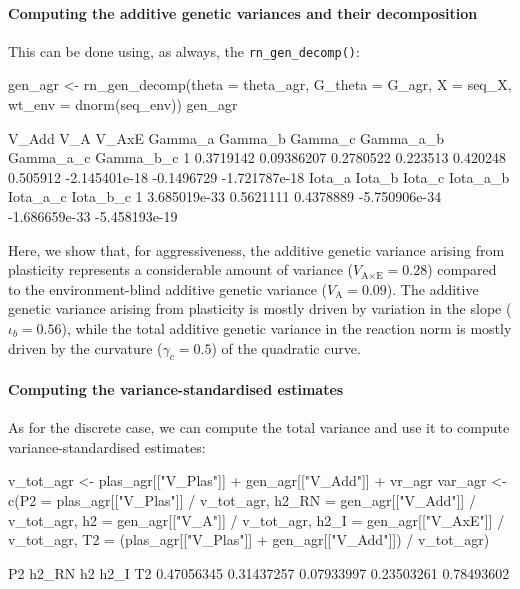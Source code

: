 \documentclass[a4paper,12pt,twoside]{article}
\begin{document}
\paragraph{Computing the additive genetic variances and their decomposition}
This can be done using, as always, the \texttt{rn\_gen\_decomp()}:
\begin{Rinput}
gen_agr <-
    rn_gen_decomp(theta     = theta_agr,
                  G_theta   = G_agr,
                  X         = seq_X,
                  wt_env    = dnorm(seq_env))
gen_agr
\end{Rinput}
\begin{Routput}
      V_Add        V_A     V_AxE  Gamma_a  Gamma_b  Gamma_c     Gamma_a_b  Gamma_a_c     Gamma_b_c
1 0.3719142 0.09386207 0.2780522 0.223513 0.420248 0.505912 -2.145401e-18 -0.1496729 -1.721787e-18
        Iota_a    Iota_b    Iota_c      Iota_a_b      Iota_a_c      Iota_b_c
1 3.685019e-33 0.5621111 0.4378889 -5.750906e-34 -1.686659e-33 -5.458193e-19
\end{Routput}
Here, we show that, for aggressiveness, the additive genetic variance arising from plasticity represents a considerable amount of variance ($V_{\text{A}\times\text{E}}=0.28$) compared to the environment-blind additive genetic variance ($V_{\text{A}}=0.09$).
The additive genetic variance arising from plasticity is mostly driven by variation in the slope ($\iota_{b} = 0.56$), while the total additive genetic variance in the reaction norm is mostly driven by the curvature ($\gamma_{c}=0.5$) of the quadratic curve.

\paragraph{Computing the variance-standardised estimates}
As for the discrete case, we can compute the total variance and use it to compute variance-standardised estimates:
\begin{Rinput}
v_tot_agr <- plas_agr[["V_Plas"]] + gen_agr[["V_Add"]] + vr_agr
var_agr <-
    c(P2     = plas_agr[["V_Plas"]] / v_tot_agr,
      h2_RN  = gen_agr[["V_Add"]] / v_tot_agr,
      h2     = gen_agr[["V_A"]] / v_tot_agr,
      h2_I   = gen_agr[["V_AxE"]] / v_tot_agr,
      T2     = (plas_agr[["V_Plas"]] + gen_agr[["V_Add"]]) / v_tot_agr)
\end{Rinput}
\begin{Routput}
        P2      h2_RN         h2       h2_I         T2 
0.47056345 0.31437257 0.07933997 0.23503261 0.78493602 
\end{Routput}
\end{document}
